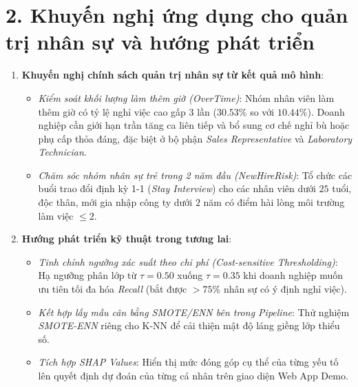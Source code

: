 \section*{2. Khuyến nghị ứng dụng cho quản trị nhân sự và hướng phát triển}
\begin{enumerate}
    \item \textbf{Khuyến nghị chính sách quản trị nhân sự từ kết quả mô hình}:
    \begin{itemize}
        \item \textit{Kiểm soát khối lượng làm thêm giờ (\textit{OverTime})}: Nhóm nhân viên làm thêm giờ có tỷ lệ nghỉ việc cao gấp $3$ lần ($30.53\%$ so với $10.44\%$). Doanh nghiệp cần giới hạn trần tăng ca liên tiếp và bổ sung cơ chế nghỉ bù hoặc phụ cấp thỏa đáng, đặc biệt ở bộ phận \textit{Sales Representative} và \textit{Laboratory Technician}.
        \item \textit{Chăm sóc nhóm nhân sự trẻ trong 2 năm đầu (\textit{NewHireRisk})}: Tổ chức các buổi trao đổi định kỳ 1-1 (\textit{Stay Interview}) cho các nhân viên dưới $25$ tuổi, độc thân, mới gia nhập công ty dưới $2$ năm có điểm hài lòng môi trường làm việc $\le 2$.
    \end{itemize}
    \item \textbf{Hướng phát triển kỹ thuật trong tương lai}:
    \begin{itemize}
        \item \textit{Tinh chỉnh ngưỡng xác suất theo chi phí (\textit{Cost-sensitive Thresholding})}: Hạ ngưỡng phân lớp từ $\tau = 0.50$ xuống $\tau = 0.35$ khi doanh nghiệp muốn ưu tiên tối đa hóa \textit{Recall} (bắt được $>75\%$ nhân sự có ý định nghỉ việc).
        \item \textit{Kết hợp lấy mẫu cân bằng SMOTE/ENN bên trong Pipeline}: Thử nghiệm \textit{SMOTE-ENN} riêng cho K-NN để cải thiện mật độ láng giềng lớp thiểu số.
        \item \textit{Tích hợp SHAP Values}: Hiển thị mức đóng góp cụ thể của từng yếu tố lên quyết định dự đoán của từng cá nhân trên giao diện Web App Demo.
    \end{itemize}
\end{enumerate}
